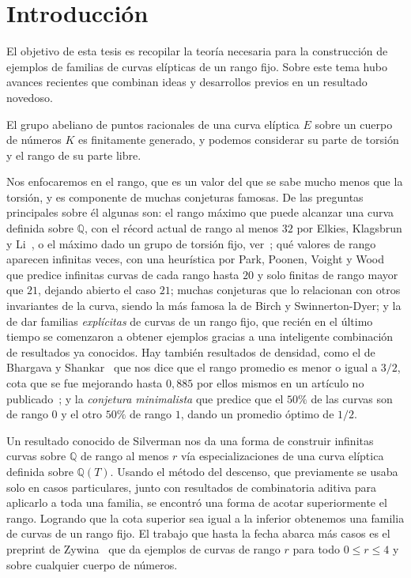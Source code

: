 \documentclass[a4paper]{book}
\theoremstyle{definition}
\theoremstyle{plain}
\newcommand{\QQ}{\mathbb{Q}}
\begin{document}
\section*{Introducción}

El objetivo de esta tesis es recopilar la teoría necesaria para la construcción de ejemplos de familias de curvas elípticas de un rango fijo. Sobre este tema hubo avances recientes que combinan ideas y desarrollos previos en un resultado novedoso.

El grupo abeliano de puntos racionales de una curva elíptica $E$ sobre un cuerpo de números $K$ es finitamente generado, y podemos considerar su parte de torsión y el rango de su parte libre. 

Nos enfocaremos en el rango, que es un valor del que se sabe mucho menos que la torsión, y es componente de muchas conjeturas famosas. De las preguntas principales sobre él algunas son: el rango máximo que puede alcanzar una curva definida sobre $\QQ$, con el récord actual de rango al menos $32$ por Elkies, Klagsbrun y Li~\cite{DujellaRankRecords}, o el máximo dado un grupo de torsión fijo, ver~\cite{ElkiesKlagsbrun2020}; qué valores de rango aparecen infinitas veces, con una heurística por Park, Poonen, Voight y Wood~\cite{ParkPoonenVoightWood2019} que predice infinitas curvas de cada rango hasta $20$ y solo finitas de rango mayor que $21$, dejando abierto el caso $21$; muchas conjeturas que lo relacionan con otros invariantes de la curva, siendo la más famosa la de Birch y Swinnerton-Dyer; y la de dar familias \emph{explícitas} de curvas de un rango fijo, que recién en el último tiempo se comenzaron a obtener ejemplos gracias a una inteligente combinación de resultados ya conocidos. Hay también resultados de densidad, como el de Bhargava y Shankar~\cite{BhargavaShankar2015} que nos dice que el rango promedio es menor o igual a $3/2$, cota que se fue mejorando hasta $0,885$ por ellos mismos en un artículo no publicado~\cite{BhargavaShankar2013}; y la \emph{conjetura minimalista} que predice que el $50\%$ de las curvas son de rango $0$ y el otro $50\%$ de rango $1$, dando un promedio óptimo de $1/2$.

Un resultado conocido de Silverman nos da una forma de construir infinitas curvas sobre $\QQ$ de rango al menos $r$ vía especializaciones de una curva elíptica definida sobre $\QQ(T)$. Usando el método del descenso, que previamente se usaba solo en casos particulares, junto con resultados de combinatoria aditiva para aplicarlo a toda una familia, se encontró una forma de acotar superiormente el rango. Logrando que la cota superior sea igual a la inferior obtenemos una familia de curvas de un rango fijo. El trabajo que hasta la fecha abarca más casos es el preprint de Zywina~\cite{Zywina2026SmallRank} que da ejemplos de curvas de rango $r$ para todo $0\leq r \leq 4$ y sobre cualquier cuerpo de números. 
\end{document}
